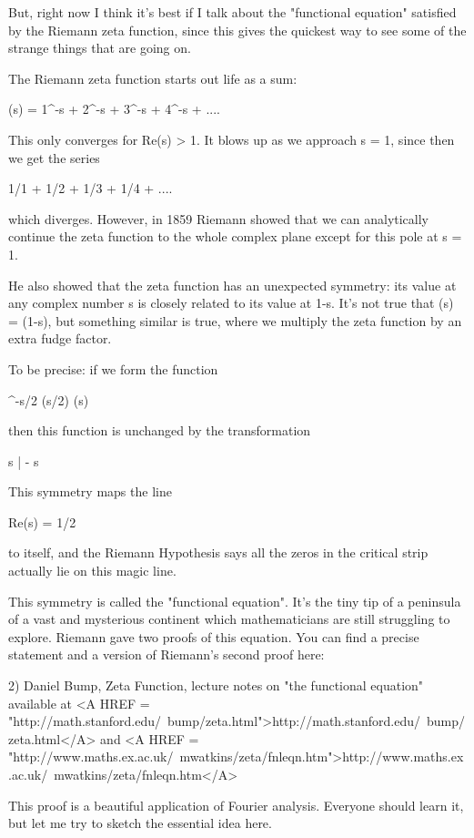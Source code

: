 But, right now I think it's best if I talk about the "functional equation" 
satisfied by the Riemann zeta function, since this gives the quickest way 
to see some of the strange things that are going on.

The Riemann zeta function starts out life as a sum:

\zeta (s) = 1^{-s} + 2^{-s} + 3^{-s} + 4^{-s} + ....

This only converges for Re(s) > 1.  It blows up as we approach s = 1, 
since then we get the series

1/1 + 1/2 + 1/3 + 1/4 + ....

which diverges.  However, in 1859 Riemann showed that we can analytically 
continue the zeta function to the whole complex plane except for this pole 
at s = 1.  

He also showed that the zeta function has an unexpected symmetry: 
its value at any complex number s is closely related to its value at 1-s.  
It's not true that \zeta (s) = \zeta (1-s), but something similar is true, 
where we multiply the zeta function by an extra fudge factor.  

To be precise: if we form the function

\pi ^{-s/2} \Gamma (s/2) \zeta (s)

then this function is unchanged by the transformation

s | - s

This symmetry maps the line 

Re(s) = 1/2

to itself, and the Riemann Hypothesis says all the \zeta  zeros in 
the critical strip actually lie on this magic line.  

This symmetry is called the "functional equation".  It's the tiny tip of a 
peninsula of a vast and mysterious continent which mathematicians are still 
struggling to explore.  Riemann gave two proofs of this equation.  You can 
find a precise statement and a version of Riemann's second proof here:

2) Daniel Bump, Zeta Function, lecture notes on "the functional
equation" available at <A HREF = "http://math.stanford.edu/~bump/zeta.html">http://math.stanford.edu/~bump/zeta.html</A>
and <A HREF = "http://www.maths.ex.ac.uk/~mwatkins/zeta/fnleqn.htm">http://www.maths.ex.ac.uk/~mwatkins/zeta/fnleqn.htm</A>

This proof is a beautiful application of Fourier analysis.  Everyone
should learn it, but let me try to sketch the essential idea here.

